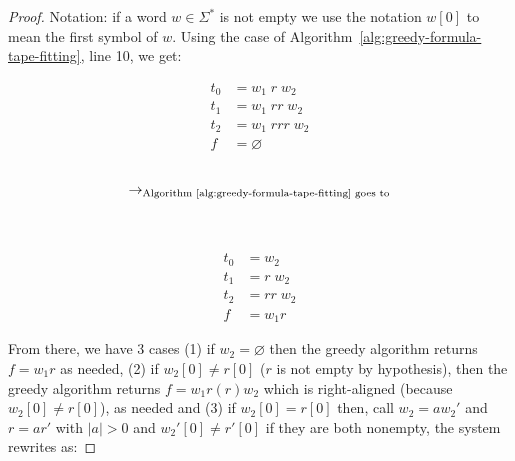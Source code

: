 \begin{proof}

    Notation: if a word $w\in\Sigma^*$ is not empty we use the notation $w[0]$ to mean the first symbol of $w$. Using the case of Algorithm~\ref{alg:greedy-formula-tape-fitting}, line 10, we get:
    \setlength{\columnsep}{-7.5cm}
    \begin{multicols}{3}
        \noindent
        \begin{align*}
            t_0 & = w_1\; r\;  w_2     \\
            t_1 & = w_1\; rr\;  w_2    \\
            t_2 & = w_1\; r r r\;  w_2 \\
            f   & = \varnothing
        \end{align*}
        \begin{align*}
             &                                                                   \\
            \to_{\text{Algorithm~\ref{alg:greedy-formula-tape-fitting} goes to}} \\
             &                                                                   \\
             &
        \end{align*}
        \begin{align*}
            t_0 & = w_2        \\
            t_1 & = r\;  w_2   \\
            t_2 & = r r\;  w_2 \\
            f   & = w_1r
        \end{align*}
    \end{multicols}

    From there, we have 3 cases (1) if $w_2 = \varnothing$ then the greedy algorithm returns $f = w_1 r$ as needed, (2) if $w_2[0] \neq r[0]$ ($r$ is not empty by hypothesis), then the greedy algorithm returns $f = w_1 r (r) w_2$ which is right-aligned (because $w_2[0] \neq r[0]$), as needed and (3) if $w_2[0] = r[0]$ then, call $w_2 = a w_2'$ and $r = ar'$ with $|a| > 0$ and  $w_2'[0] \neq r'[0]$ if they are both nonempty, the system rewrites as:


\end{proof}
